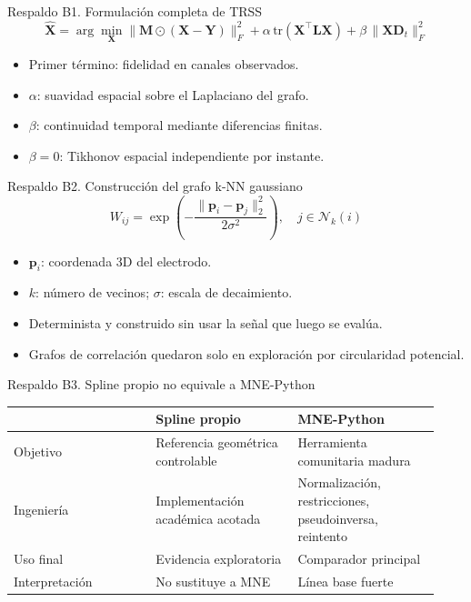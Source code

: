 \documentclass[aspectratio=169,10pt]{beamer}
\begin{document}
\appendix
\begin{frame}{Respaldo B1. Formulación completa de TRSS}
\small
\[
\widehat{\mathbf X}=\arg\min_{\mathbf X}
\|\mathbf M\odot(\mathbf X-\mathbf Y)\|_F^2
+\alpha\,\mathrm{tr}(\mathbf X^\top\mathbf L\mathbf X)
+\beta\,\|\mathbf X\mathbf D_t\|_F^2
\]
\begin{itemize}
\item Primer término: fidelidad en canales observados.
\item $\alpha$: suavidad espacial sobre el Laplaciano del grafo.
\item $\beta$: continuidad temporal mediante diferencias finitas.
\item $\beta=0$: Tikhonov espacial independiente por instante.
\end{itemize}
\end{frame}

\begin{frame}{Respaldo B2. Construcción del grafo k-NN gaussiano}
\[
W_{ij}=\exp\!\left(-\frac{\|\mathbf p_i-\mathbf p_j\|_2^2}{2\sigma^2}\right),\quad j\in\mathcal N_k(i)
\]
\begin{itemize}
\item $\mathbf p_i$: coordenada 3D del electrodo.
\item $k$: número de vecinos; $\sigma$: escala de decaimiento.
\item Determinista y construido sin usar la señal que luego se evalúa.
\item Grafos de correlación quedaron solo en exploración por circularidad potencial.
\end{itemize}
\end{frame}

\begin{frame}{Respaldo B3. Spline propio no equivale a MNE-Python}
\small
\begin{tabular}{@{}>{\raggedright\arraybackslash}p{0.31\linewidth}>{\raggedright\arraybackslash}p{0.31\linewidth}>{\raggedright\arraybackslash}p{0.31\linewidth}@{}}
\toprule
& \textbf{Spline propio} & \textbf{MNE-Python}\\
\midrule
Objetivo & Referencia geométrica controlable & Herramienta comunitaria madura\\
Ingeniería & Implementación académica acotada & Normalización, restricciones, pseudoinversa, reintento\\
Uso final & Evidencia exploratoria & Comparador principal\\
Interpretación & No sustituye a MNE & Línea base fuerte\\
\bottomrule
\end{tabular}
\end{frame}
\end{document}
